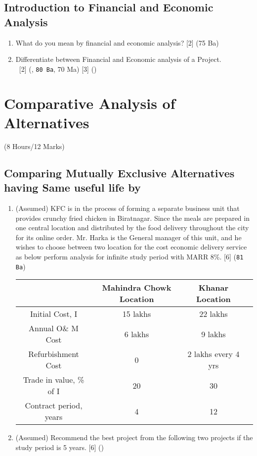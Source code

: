 \documentclass[12pt]{article}
\newcommand{\enter}{\\\textcolor{white}{1}}
\begin{document}
\subsection{Introduction to Financial and Economic Analysis}
\begin{enumerate}[noitemsep, topsep = 0pt]
	\item What do you mean by financial and economic analysis? \hfill [2] (75 Ba)

	\item Differentiate between Financial and Economic analysis of a Project.
	\enter\hfill [2] (, \texttt{80 Ba}, 70 Ma) [3] ()
\end{enumerate}

\pagebreak
\section{Comparative Analysis of Alternatives}
\begin{center}(8 Hours/12 Marks)\end{center}
\subsection{Comparing Mutually Exclusive Alternatives having Same useful life by}
\begin{enumerate}[noitemsep, topsep=0pt]
	\item (Assumed) KFC is in the process of forming a separate business unit that provides crunchy fried chicken in Biratnagar. Since the meals are prepared in one central location and distributed by the food delivery throughout the city for its online order. Mr. Harka is the General manager of this unit, and he wishes to choose between two location for the cost economic delivery service as below perform analysis for infinite study period with MARR 8\%. \hfill [6] (\texttt{81 Ba})\\
	\begin{tabular}{|c|c|c|c|}
		\hline
		 & Mahindra Chowk Location & Khanar Location \\ \hline
		Initial Cost, I & 15 lakhs & 22 lakhs \\ \hline
		Annual O\& M Cost & 6 lakhs & 9 lakhs \\ \hline
		Refurbishment Cost & 0 & 2 lakhs every 4 yrs \\ \hline
		Trade in value, \% of I & 20 & 30 \\ \hline
		Contract period, years & 4 & 12 \\ \hline
	\end{tabular}
	
	\item (Assumed) Recommend the best project from the following two projects if the study period is 5 years. \hfill [6] ()\\
	
\end{enumerate}
\end{document}
